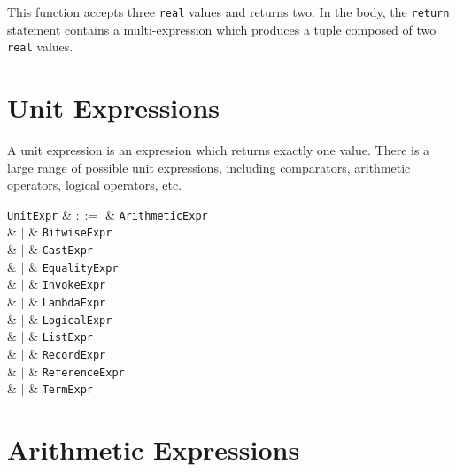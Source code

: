 

This function accepts three \lstinline{real} values and returns two.  In the body, the \lstinline{return} statement contains a multi-expression which produces a tuple composed of two \lstinline{real} values.


\section{Unit Expressions}
\label{c_expr_unit}

A unit expression is an expression which returns exactly one value.  There is a large range of possible unit expressions, including comparators, arithmetic operators, logical operators, etc.

\begin{syntax}
  \verb+UnitExpr+ & $::=$ & \verb+ArithmeticExpr+\\
                  &  $|$  & \verb+BitwiseExpr+\\
                  &  $|$  & \verb+CastExpr+\\
                  &  $|$  & \verb+EqualityExpr+\\
                  &  $|$  & \verb+InvokeExpr+\\
                  &  $|$  & \verb+LambdaExpr+\\
                  &  $|$  & \verb+LogicalExpr+\\
                  &  $|$  & \verb+ListExpr+\\
                  &  $|$  & \verb+RecordExpr+\\
                  &  $|$  & \verb+ReferenceExpr+\\
                  &  $|$  & \verb+TermExpr+\\
                
\end{syntax}


\section{Arithmetic Expressions}
\label{c_expr_arithmetic}

